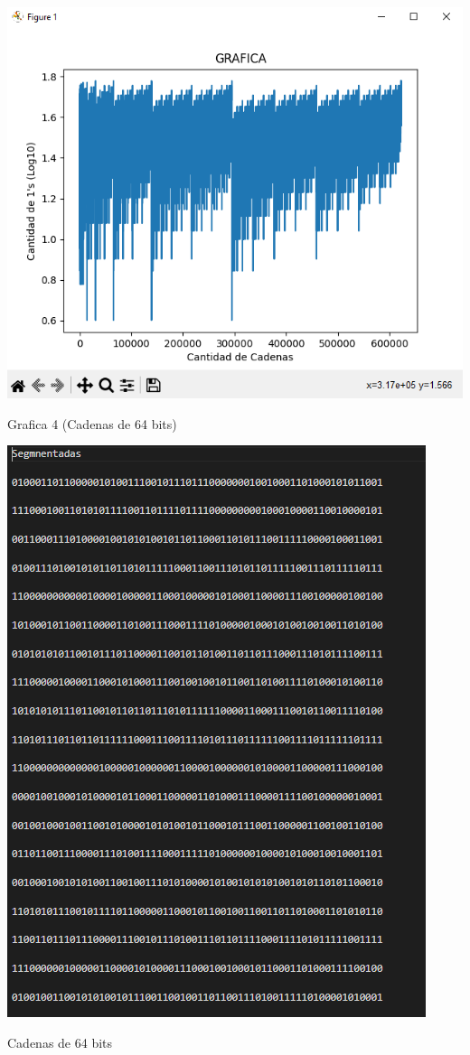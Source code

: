 \documentclass{article}
\begin{document}
\begin{center}
    \includegraphics[scale = 0.7]{graphic4.png}
    \caption{Grafica 4 (Cadenas de 64 bits)}
\end{center}

\begin{center}
    \includegraphics[scale = 1]{segments.png}
    \caption{Cadenas de 64 bits}
\end{center}
\end{document}
